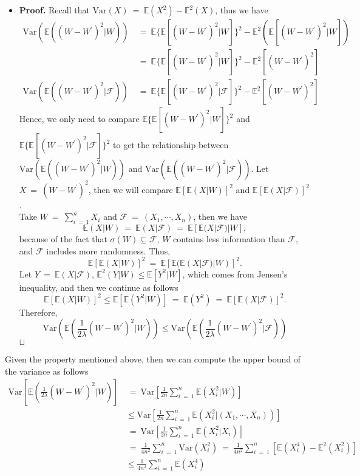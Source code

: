 \documentclass[12pt]{article}
\newcommand\qed{\hfill\hbox{\rlap{$\sqcap$}$\sqcup$}}
\newcommand{\eq }{\: = \:}
\theoremstyle{nonumberplain}
\begin{document}
\begin{itemize}
\item[] \textbf{Proof.} Recall that $\mathrm{Var}(X)\eq \mathbb{E}(X^{2})-\mathbb{E}^{2}(X)$, thus we have
\begin{align*}
\mathrm{Var}(\mathbb{E}((W-W^{\prime})^{2}|W))&\eq \mathbb{E}\{\mathbb{E}[(W-W^{\prime})^{2}|W]\}^{2}-\mathbb{E}^{2}(\mathbb{E}[(W-W^{\prime})^{2}|W]) \\
&\eq \mathbb{E}\{\mathbb{E}[(W-W^{\prime})^{2}|W]\}^{2}-\mathbb{E}^{2}[(W-W^{\prime})^{2}]\\
\mathrm{Var}(\mathbb{E}((W-W^{\prime})^{2}|\mathcal{F}))&\eq \mathbb{E}\{\mathbb{E}[(W-W^{\prime})^{2}|\mathcal{F}]\}^{2}-\mathbb{E}^{2}[(W-W^{\prime})^{2}]
\end{align*}
Hence, we only need to compare $\mathbb{E}\{\mathbb{E}[(W-W^{\prime})^{2}|W]\}^{2}$ and $\mathbb{E}\{\mathbb{E}[(W-W^{\prime})^{2}|\mathcal{F}]\}^{2}$ to get the relationship between $\mathrm{Var}(\mathbb{E}((W-W^{\prime})^{2}|W))$ and $\mathrm{Var}(\mathbb{E}((W-W^{\prime})^{2}|\mathcal{F}))$.
Let $X\eq (W-W^{\prime})^{2}$, then we will compare $\mathbb{E}[\mathbb{E}(X|W)]^{2}$ and $\mathbb{E}[\mathbb{E}(X|\mathcal{F})]^{2}$.\\
Take $W\eq \sum_{i\eq 1}^{n}X_{i}$ and $\mathcal{F}\eq (X_{1}, \cdots, X_{n})$, then we have
\begin{displaymath}
\mathbb{E}(X|W)\eq \mathbb{E}(X|\mathcal{F})\eq \mathbb{E}[\mathbb{E}(X|\mathcal{F})|W],
\end{displaymath}
because of the fact that $\sigma (W)\subseteq \mathcal{F}$, $W$ contains less information than $\mathcal{F}$, and $\mathcal{F}$ includes more randomness. Thus,
$$
\mathbb{E}[\mathbb{E}(X|W)]^{2}\eq \mathbb{E}[\mathbb{E}(\mathbb{E}(X|\mathcal{F})|W)]^{2}.
$$
Let $Y\eq \mathbb{E}(X|\mathcal{F})$, $\mathbb{E}^{2}(Y|W)\leq \mathbb{E}[Y^{2}|W]$, which comes from Jensen's inequality, and then we continue as follows
$$
\mathbb{E}[\mathbb{E}(X|W)]^{2}\leq \mathbb{E}[\mathbb{E}(Y^{2}|W)]\eq \mathbb{E}(Y^{2})\eq \mathbb{E}[\mathbb{E}(X|\mathcal{F})]^{2}.
$$
Therefore,
$$
\mathrm{Var}(\mathbb{E}(\frac{1}{2\lambda}(W-W^{\prime})^{2}|W))\leq \mathrm{Var}(\mathbb{E}(\frac{1}{2\lambda}(W-W^{\prime})^{2}|\mathcal{F}))
$$
\qed
\end{itemize}
Given the property mentioned above, then we can compute the upper bound of the variance as follows
\begin{align*}
\mathrm{Var}[\mathbb{E}(\frac{1}{2\lambda}(W-W^{\prime})^{2}|W)]&\eq \mathrm{Var}[\frac{1}{2n} \sum_{i\eq 1}^{n} \mathbb{E}(X_{i}^{2}|W)]\\
&\leq \mathrm{Var}[\frac{1}{2n} \sum_{i\eq 1}^{n} \mathbb{E}(X_{i}^{2}|(X_{1}, \cdots, X_{n}))]\\
&\eq \mathrm{Var}[\frac{1}{2n} \sum_{i\eq 1}^{n} \mathbb{E}(X_{i}^{2}|X_{i})]\\
&\eq \frac{1}{4n^{2}} \sum_{i\eq 1}^{n} \mathrm{Var}(X_{i}^{2})\eq \frac{1}{4n^{2}} \sum_{i\eq 1}^{n} [\mathbb{E}(X_{i}^{4})-\mathbb{E}^{2}(X_{i}^{2})]\\
&\leq \frac{1}{4n^{2}} \sum_{i\eq 1}^{n} \mathbb{E}(X_{i}^{4})
\end{align*}
\end{document}
